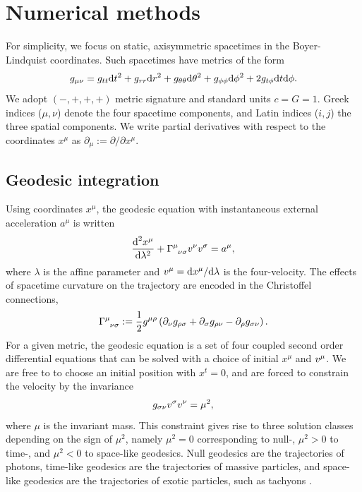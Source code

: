 \section{Numerical methods}

For simplicity, we focus on static, axisymmetric spacetimes in the Boyer-Lindquist coordinates. Such spacetimes have metrics of the form 
\begin{equation}
\label{eq:static_axisymmetric_metric}
    g_{\mu\nu} 
    = g_{tt} \text{d} t^2 
    + g_{rr} \text{d} r^2 
    + g_{\theta\theta} \text{d} \theta^2 
    + g_{\phi\phi} \text{d} \phi^2 
    + 2g_{t\phi} \text{d} t \text{d} \phi.
\end{equation}
We adopt $(-, +, +, +)$ metric signature and standard units $c = G = 1$. Greek indices ($\mu, \nu$) denote the four spacetime components, and Latin indices ($i, j$) the three spatial components. We write partial derivatives with respect to the coordinates $x^\mu$ as $\partial_\mu := \partial / \partial x^\mu$.


\subsection{Geodesic integration}

Using coordinates $x^\mu$, the geodesic equation with instantaneous external acceleration $a^\mu$ is written
\begin{equation}
\label{eq:geodesic_equation}
    \frac{\d^2 x^\mu}{\d \lambda^2}
    + \utensor{\Gamma}{\mu}{\nu\sigma}
    \vel{\nu}
    \vel{\sigma}
    = a^\mu,
\end{equation}
where $\lambda$ is the affine parameter and $v^\mu = \text{d} x^\mu / \text{d} \lambda$ is the four-velocity. The effects of spacetime curvature on the trajectory are encoded in the Christoffel connections, 
\begin{equation}
\label{eq:christoffel}
    \utensor{\Gamma}{\mu}{\nu\sigma}
    := \frac{1}{2} g^{\mu\rho} 
    \left(
        \partial_{\nu}g_{\rho \sigma}
        + \partial_{\sigma}g_{\rho \nu}
        - \partial_{\rho}g_{\sigma \nu}
    \right).
\end{equation}
For a given metric, the geodesic equation is a set of four coupled second order differential equations that can be solved with a choice of initial $x^\mu$ and $v^{\mu}$. We are free to to choose an initial position with $x^t = 0$, and are forced to constrain the velocity by the invariance
\begin{equation}
\label{eq:velocity_constraint}
    g_{\sigma\nu} v^{\sigma} v^{\nu} = \mu^2,
\end{equation}
where $\mu$ is the invariant mass. This constraint gives rise to three solution classes depending on the sign of $\mu^2$, namely $\mu^2 = 0$ corresponding to null-, $\mu^2 > 0$ to time-, and $\mu^2 < 0$ to space-like geodesics. Null geodesics are the trajectories of photons, time-like geodesics are the trajectories of massive particles, and space-like geodesics are the trajectories of exotic particles, such as tachyons \citneeded. 

